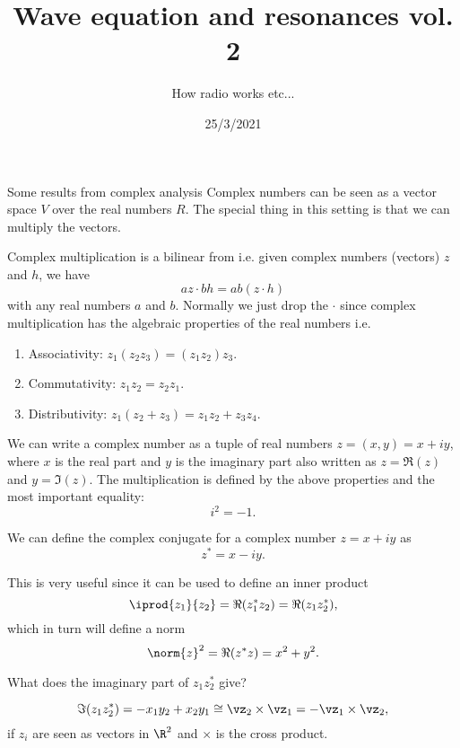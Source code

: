 

\title{Wave equation and resonances vol. 2}
\subtitle{How radio works etc...}
\date{25/3/2021}
\date{}


	
	\maketitle
	

\begin{frame}{Some results from complex analysis}
	Complex numbers can be seen as a vector space $ V $ over the real numbers $ R $. The special thing in this setting is that we can multiply the vectors.
	
	\pause
	Complex multiplication is a bilinear from i.e. given complex numbers (vectors) $ z $ and $ h $, we have
	\[ az \cdot bh = ab (z \cdot h) \]
	with any real numbers $ a $ and $ b $. Normally we just drop the $ \cdot $ since complex multiplication has the algebraic properties of the real numbers i.e.
	\begin{enumerate}
		\item Associativity: $ z_1 (z_2 z_3) = (z_1 z_2)z_3 $.
		\item Commutativity: $z_1 z_2 = z_2 z_1$.
		\item Distributivity: $z_1 (z_2 + z_3) = z_1 z_2 + z_3 z_4$.
	\end{enumerate}
	
	\pause
	We can write a complex number as a tuple of real numbers $ z = (x,y) = x + iy$, where $ x $ is the \alert{real part} and $ y $ is the \alert{imaginary part} also written as $ z = \Re(z) $ and $ y = \Im(z) $. The multiplication is defined by the above properties and the most important equality:
	$$ i^2 = -1. $$
\end{frame}

\begin{frame}
	We can define the complex conjugate for a complex number $ z = x + iy $ as
	\[ z^* = x - iy. \]
	
	\pause
	This is very useful since it can be used to define an inner product 
	\[ \iprod{z_1}{z_2} = \Re(z_1^* z_2) = \Re(z_1 z_2^*), \]
	which in turn will define a norm
	\[ \norm{z}^2 =  \Re(z^* z) = x^2 + y^2. \]
	
	\pause
	What does the imaginary part of $ z_1 z_2^* $ give?
	
	\pause
	\[ \Im(z_1 z_2^*) = -x_1 y_2 + x_2 y_1 \cong \vz_2 \times \vz_1 = -\vz_1 \times \vz_2, \]
	if $ z_i $ are seen as vectors in $ \R^2 $ and $ \times $ is the cross product.
\end{frame}

